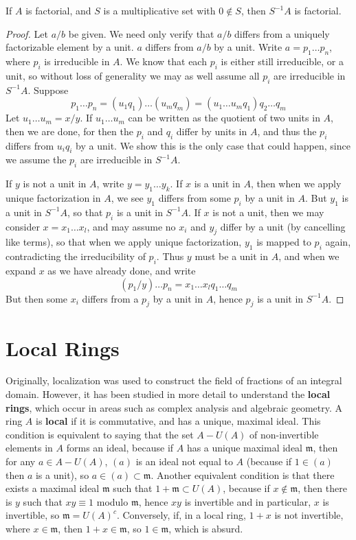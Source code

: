 \begin{theorem}
    If $A$ is factorial, and $S$ is a multiplicative set with $0 \not \in S$, then $S^{-1}A$ is factorial.
\end{theorem}
\begin{proof}
    Let $a/b$ be given. We need only verify that $a/b$ differs from a uniquely factorizable element by a unit. $a$ differs from $a/b$ by a unit. Write $a = p_1 \dots p_n$, where $p_i$ is irreducible in $A$. We know that each $p_i$ is either still irreducible, or a unit, so without loss of generality we may as well assume all $p_i$ are irreducible in $S^{-1}A$. Suppose
    \[ p_1 \dots p_n = (u_1 q_1) \dots (u_m q_m) = (u_1 \dots u_m q_1) q_2 \dots q_m \]
    Let $u_1 \dots u_m = x/y$. If $u_1 \dots u_m$ can be written as the quotient of two units in $A$, then we are done, for then the $p_i$ and $q_i$ differ by units in $A$, and thus the $p_i$ differs from $u_i q_i$ by a unit. We show this is the only case that could happen, since we assume the $p_i$ are irreducible in $S^{-1}A$.

    If $y$ is not a unit in $A$, write $y = y_1 \dots y_k$. If $x$ is a unit in $A$, then when we apply unique factorization in $A$, we see $y_1$ differs from some $p_i$ by a unit in $A$. But $y_1$ is a unit in $S^{-1}A$, so that $p_i$ is a unit in $S^{-1}A$. If $x$ is not a unit, then we may consider $x = x_1 \dots x_{l}$, and may assume no $x_i$ and $y_j$ differ by a unit (by cancelling like terms), so that when we apply unique factorization, $y_1$ is mapped to $p_i$ again, contradicting the irreducibility of $p_i$. Thus $y$ must be a unit in $A$, and when we expand $x$ as we have already done, and write
    \[ (p_1/y) \dots p_n = x_1 \dots x_{l} q_1 \dots q_m \]
    But then some $x_i$ differs from a $p_j$ by a unit in $A$, hence $p_j$ is a unit in $S^{-1}A$.
\end{proof}

\section{Local Rings}

Originally, localization was used to construct the field of fractions of an integral domain. However, it has been studied in more detail to understand the {\bf local rings}, which occur in areas such as complex analysis and algebraic geometry. A ring $A$ is {\bf local} if it is commutative, and has a unique, maximal ideal. This condition is equivalent to saying that the set $A - U(A)$ of non-invertible elements in $A$ forms an ideal, because if $A$ has a unique maximal ideal $\mathfrak{m}$, then for any $a \in A - U(A)$, $(a)$ is an ideal not equal to $A$ (because if $1 \in (a)$ then $a$ is a unit), so $a \in (a) \subset \mathfrak{m}$. Another equivalent condition is that there exists a maximal ideal $\mathfrak{m}$ such that $1 + \mathfrak{m} \subset U(A)$, because if $x \not \in \mathfrak{m}$, then there is $y$ such that $xy \equiv 1$ modulo $\mathfrak{m}$, hence $xy$ is invertible and in particular, $x$ is invertible, so $\mathfrak{m} = U(A)^c$. Conversely, if, in a local ring, $1 + x$ is not invertible, where $x \in \mathfrak{m}$, then $1 + x \in \mathfrak{m}$, so $1 \in \mathfrak{m}$, which is absurd.

